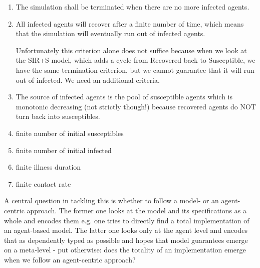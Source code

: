 \begin{enumerate}
	\item The simulation shall be terminated when there are no more infected agents.
	
	\item All infected agents will recover after a finite number of time, which means that the simulation will eventually run out of infected agents. 
	
	Unfortunately this criterion alone does not suffice because when we look at the SIR+S model, which adds a cycle from Recovered back to Susceptible, we have the same termination criterion, but we cannot guarantee that it will run out of infected. We need an additional criteria.

	\item The source of infected agents is the pool of susceptible agents which is monotonic decreasing (not strictly though!) because recovered agents do NOT turn back into susceptibles.
	
	\item finite number of initial susceptibles
	
	\item finite number of initial infected
	
	\item finite illness duration
	
	\item finite contact rate
\end{enumerate}

A central question in tackling this is whether to follow a model- or an agent-centric approach. The former one looks at the model and its specifications as a whole and encodes them e.g. one tries to directly find a total implementation of an agent-based model. The latter one looks only at the agent level and encodes that as dependently typed as possible and hopes that model guarantees emerge on a meta-level - put otherwise: does the totality of an implementation emerge when we follow an agent-centric approach?



